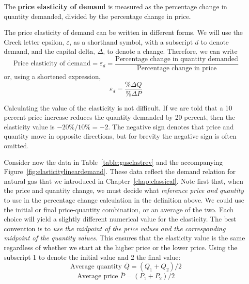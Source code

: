 \begin{DefBox}
The \textbf{price elasticity of demand} is measured as the percentage change in quantity demanded, divided by the percentage change in price.
\end{DefBox}

\newhtmlpage

The price elasticity of demand can be written in different forms. We will
use the Greek letter epsilon, $\varepsilon$, as a shorthand symbol, with a
subscript $d$ to denote demand, and the capital delta, $\Delta$, to denote a
change. Therefore, we can write
\begin{equation*}
\text{Price elasticity of demand}=\varepsilon_{d}=\frac{\text{Percentage
change in quantity demanded}}{\text{Percentage change in price}} 
\end{equation*}%
or, using a shortened expression, 
\begin{equation}\label{eq:priceelastdemand}
\varepsilon_{d}=\frac{\%\Delta Q}{\%\Delta P}
\end{equation}

Calculating the value of the elasticity is not difficult. If we are told
that a 10 percent price increase reduces the quantity demanded by 20
percent, then the elasticity value is $-20\%/10\%=-2.$ The negative sign
denotes that price and quantity move in opposite directions, but for brevity
the negative sign is often omitted.

Consider now the data in Table~\ref{table:gaselastrev} and the accompanying
Figure~\ref{fig:elasticitylineardemand}. These data reflect the demand
relation for natural gas that we introduced in Chapter~\ref{chap:classical}.
Note first that, when the price and quantity change, we must decide what 
\textit{reference price and quantity} to use in the percentage change
calculation in the definition above. We could use the initial or final
price-quantity combination, or an average of the two. Each choice will yield
a slightly different numerical value for the elasticity. The best convention
is to \textit{use the midpoint of the price values and the corresponding
midpoint of the quantity values}. This ensures that the elasticity value is
the same regardless of whether we start at the higher price or the lower
price. Using the subscript 1 to denote the initial value and 2 the final
value:
\begin{equation*}
\text{Average quantity }\overline{Q}=(Q_{1}+Q_{2})/2 
\end{equation*}%
\begin{equation*}
\text{Average price }\overline{P}=(P_{1}+P_{2})/2 
\end{equation*}

